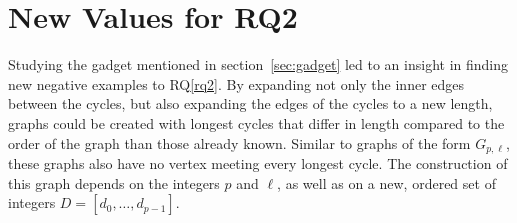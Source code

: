 \section{New Values for RQ2}

Studying the gadget mentioned in section~\ref{sec:gadget} led to an insight in finding new negative examples to RQ\ref{rq2}. By expanding not only the inner edges between the cycles, but also expanding the edges of the cycles to a new length, graphs could be created with longest cycles that differ in length compared to the order of the graph than those already known. Similar to graphs of the form $G_{p,\ell}$, these graphs also have no vertex meeting every longest cycle. The construction of this graph depends on the integers $p$ and $\ell$, as well as on a new, ordered set of integers $D = [d_0,\ldots,d_{p-1}]$.

